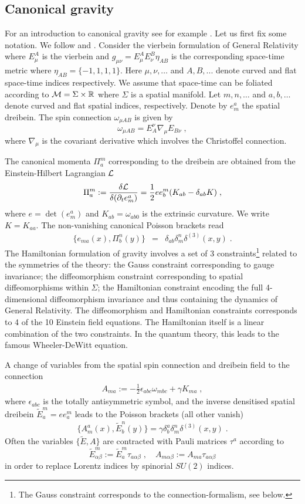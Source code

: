 \documentclass[12pt]{article}
\newcommand{\ba}{\begin{eqnarray}}
\newcommand{\ea}{\end{eqnarray}}
\def\a{\alpha}
\def\b{\beta}
\def\d{\delta}
\def\e{\epsilon}
\def\m{\mu}
\def\n{\nu}
\def\oo{\omega}
\def\t{\tau}
\def\P{\Pi}
\def\cl{{\cal L}}
\def\cm{{\cal M}}
\newcommand{\pa}{\partial}
\begin{document}
\subsection{Canonical gravity}

For an introduction to canonical gravity see for example \cite{Baez:1992tj,Nicolai:1992xx}. Let us first fix some notation. We follow \cite{Nicolai:1992xx} and \cite{Nicolai:2005mc}. Consider the vierbein formulation of General Relativity where $E^A_\m$ is the vierbein and $g_{\m\n}=E^A_\m E^B_\n \eta_{AB}$ is the corresponding space-time metric where $\eta_{AB}=\{-1,1,1,1\}$. Here $\m,\n,\ldots$ and $A,B,...$ denote curved and flat space-time indices respectively. We assume that space-time can be foliated according to $\cm=\Sigma\times \mathbb{R}$ where $\Sigma$ is a spatial manifold. Let $m,n,\ldots$ and $a,b,\ldots$ denote curved and flat spatial indices, respectively. Denote by $e^a_m$ the spatial dreibein. The spin connection $\oo_{\m AB}$ is given by
\[
\oo_{\m AB} = E_{A}^{\n}\nabla_{\m} E_{B\n}\;,
\]
where $\nabla_\m$ is the covariant derivative which involves the Christoffel connection. 


The canonical momenta $\P_a^m$ corresponding to the dreibein are obtained from the Einstein-Hilbert Lagrangian $\cl$ \cite{Nicolai:1992xx}
\[
\P_a^m:= \frac{\d\cl}{\d (\pa_t e^a_m)} = \frac{1}{2} e e^m_b(K_{ab}-\d_{ab}K)\;,
\]
where $e=\det(e^a_m)$ and $K_{ab}=\oo_{ab0}$ is the extrinsic curvature. We write $K=K_{aa}$. The non-vanishing canonical Poisson brackets read
\ba
\{ e_{ma}(x),\P^n_b(y) \} &=& \d_{ab}\d^n_m \d^{(3)}(x,y)\;.
\label{equaltime0}
\ea
The Hamiltonian formulation of gravity involves a set of 3 constraints\footnote{The Gauss constraint corresponds to the connection-formalism, see below.} related to the symmetries of the theory: 
 the Gauss constraint corresponding to gauge invariance; the diffeomorphism constraint corresponding to spatial diffeomorphisms within $\Sigma$; the Hamiltonian constraint encoding the full 4-dimensional diffeomorphism invariance and thus containing the dynamics of General Relativity. The diffeomorphism and Hamiltonian constraints corresponds to 4 of the 10 Einstein field equations. The Hamiltonian itself is a linear combination of the two  constraints. In the quantum theory, this leads to the famous Wheeler-DeWitt equation.  


A change of variables from the spatial spin connection and dreibein field to the connection 
\ba
A_{ma}:= -\frac{1}{2}\e_{abc}\oo_{mbc} +\gamma K_{ma}\;,
\label{AshCon}
\ea
where $\e_{abc}$ is the totally antisymmetric symbol, and the inverse densitised spatial dreibein $\tilde{E}^m_a=e e^m_a$ leads to the Poisson brackets (all other vanish)
\ba
\{ A^a_m(x),\tilde{E}^n_b(y) \}=\gamma \d^a_b\d^n_m \d^{(3)}(x,y)\;.
\label{equaltime}
\ea
Often the variables $\{\tilde{E},A\}$ are contracted with Pauli matrices $\t^a$ according to
\[
\tilde{E}^m_{\a\b}:= \tilde{E}^m_a \t_{a\a\b}\;,\quad A_{m\a\b}:= A_{ma}\t_{a\a\b}
\]
in order to replace Lorentz indices by spinorial $SU(2)$ indices.
\end{document}
